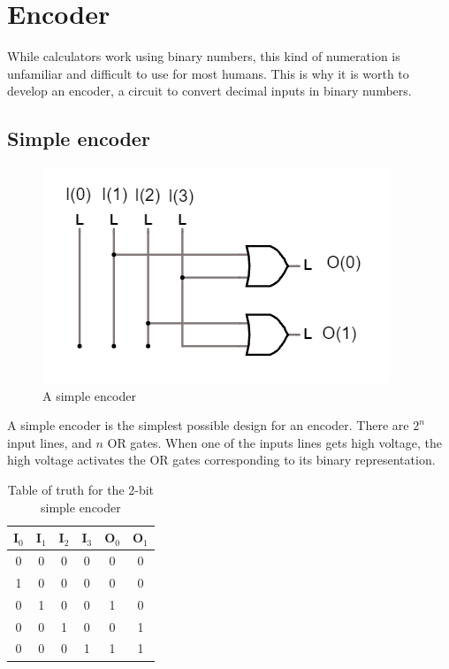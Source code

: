 \documentclass{article}
\begin{document}
\section{Encoder}

While calculators work using binary numbers, this kind of numeration is unfamiliar and difficult to use for most humans. This is why it is worth to develop an encoder, a circuit to convert decimal inputs in binary numbers.

\subsection{Simple encoder}

\begin{figure}[h]
  \centering
  \includegraphics[scale=0.7]{simple_encoder}
  \caption{A simple encoder}
  \label{simple_encoder}
\end{figure}

A simple encoder is the simplest possible design for an encoder. There are $2^n$ input lines, and $n$ OR gates. When one of the inputs lines gets high voltage, the high voltage activates the OR gates corresponding to its binary representation.

\begin{table}[h]
  \centering
  \begin{tabular}{| c | c | c | c || c | c |}
  \hline
  I$_0$ & I$_1$ & I$_2$ & I$_3$ & O$_0$ & O$_1$ \\ \hline
  0 & 0 & 0 & 0 & 0 & 0 \\ \hline
  1 & 0 & 0 & 0 & 0 & 0 \\ \hline
  0 & 1 & 0 & 0 & 1 & 0 \\ \hline
  0 & 0 & 1 & 0 & 0 & 1 \\ \hline
  0 & 0 & 0 & 1 & 1 & 1 \\ \hline
  \end{tabular}
  \caption{Table of truth for the 2-bit simple encoder}
  \label{Table_simple_encoder}
\end{table}
\end{document}
